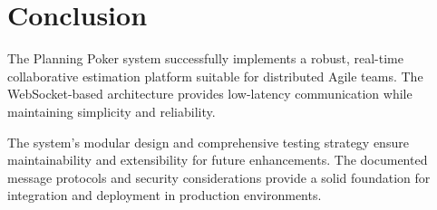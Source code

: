 \documentclass[11pt,a4paper]{article}
\begin{document}
\section{Conclusion}

The Planning Poker system successfully implements a robust, real-time collaborative estimation platform suitable for distributed Agile teams. The WebSocket-based architecture provides low-latency communication while maintaining simplicity and reliability.

The system's modular design and comprehensive testing strategy ensure maintainability and extensibility for future enhancements. The documented message protocols and security considerations provide a solid foundation for integration and deployment in production environments.



\end{document}
